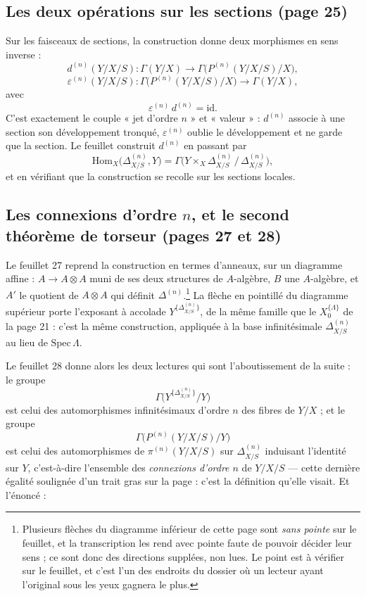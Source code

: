 \documentclass[11pt,a4paper]{article}
\begin{document}
\subsection*{Les deux opérations sur les sections (page 25)}

Sur les faisceaux de sections, la construction donne deux morphismes en sens
inverse :
\[
  d^{(n)}(Y/X/S) : \Gamma(Y/X) \longrightarrow
  \Gamma\bigl(P^{(n)}(Y/X/S)/X\bigr) ,
\]
\[
  \varepsilon^{(n)}(Y/X/S) : \Gamma\bigl(P^{(n)}(Y/X/S)/X\bigr)
  \longrightarrow \Gamma(Y/X) ,
\]
avec
\[
  \varepsilon^{(n)} \, d^{(n)} = \mathrm{id} .
\]
C'est exactement le couple « jet d'ordre $n$ » et « valeur » : $d^{(n)}$ associe
à une section son développement tronqué, $\varepsilon^{(n)}$ oublie le
développement et ne garde que la section. Le feuillet construit $d^{(n)}$ en
passant par
\[
  \mathrm{Hom}_{X}\bigl(\Delta^{(n)}_{X/S}, Y\bigr) =
  \Gamma\bigl(Y \times_{X} \Delta^{(n)}_{X/S} \,/\, \Delta^{(n)}_{X/S}\bigr) ,
\]
et en vérifiant que la construction se recolle sur les sections locales.

\subsection*{Les connexions d'ordre $n$, et le second théorème de torseur (pages 27 et 28)}

Le feuillet 27 reprend la construction en termes d'anneaux, sur un diagramme
affine : $A \to A \otimes A$ muni de ses deux structures de $A$-algèbre, $B$
une $A$-algèbre, et $A'$ le quotient de $A \otimes A$ qui définit
$\Delta^{(n)}$.\footnote{Plusieurs flèches du diagramme inférieur de cette page
sont \emph{sans pointe} sur le feuillet, et la transcription les rend avec
pointe faute de pouvoir décider leur sens ; ce sont donc des directions
supplées, non lues. Le point est à vérifier sur le feuillet, et c'est l'un des
endroits du dossier où un lecteur ayant l'original sous les yeux gagnera le
plus.} La flèche en pointillé du diagramme supérieur porte l'exposant à
accolade $Y^{\{\Delta^{(n)}_{X/S}\}}$, de la même famille que le
$X_{0}^{\{\Lambda\}}$ de la page 21 : c'est la même construction, appliquée à la
base infinitésimale $\Delta^{(n)}_{X/S}$ au lieu de $\mathrm{Spec}\,\Lambda$.

Le feuillet 28 donne alors les deux lectures qui sont l'aboutissement de la
suite :
le groupe
\[
  \Gamma\bigl(Y^{\{\Delta^{(n)}_{X/S}\}}/Y\bigr)
\]
est celui des automorphismes infinitésimaux d'ordre $n$ des fibres de $Y/X$ ;
et le groupe
\[
  \Gamma\bigl(P^{(n)}(Y/X/S)/Y\bigr)
\]
est celui des automorphismes de $\pi^{(n)}(Y/X/S)$ sur
$\Delta^{(n)}_{X/S}$ induisant l'identité sur $Y$, c'est-à-dire l'ensemble des
\emph{connexions d'ordre $n$} de $Y/X/S$ — cette dernière égalité soulignée
d'un trait gras sur la page : c'est la définition qu'elle visait. Et l'énoncé :
\end{document}
